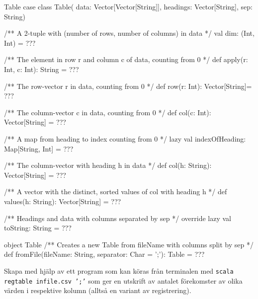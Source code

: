 \clearpage
\begin{ScalaSpec}{Table}
case class Table(
  data: Vector[Vector[String]],
  headings: Vector[String],
  sep: String){
  /** A 2-tuple with (number of rows, number of columns) in data */
  val dim: (Int, Int) = ???

  /** The element in row r and column c of data, counting from 0 */
  def apply(r: Int, c: Int): String = ???

  /** The row-vector r in data, counting from 0 */
  def row(r: Int): Vector[String]= ???

  /** The column-vector c in data, counting from 0 */
  def col(c: Int): Vector[String] = ???

  /** A map from heading to index counting from 0 */
  lazy val indexOfHeading: Map[String, Int] = ???

  /** The column-vector with heading h in data */
  def col(h: String): Vector[String] = ???

  /** A vector with the distinct, sorted values of col with heading h */
  def values(h: String): Vector[String] = ???

  /** Headings and data with columns separated by sep */
  override lazy val toString: String = ???
}
object Table {
  /** Creates a new Table from fileName with columns split by sep */
  def fromFile(fileName: String, separator: Char = ';'): Table = ???
}
\end{ScalaSpec}




\Subtask Skapa med hjälp av  ett program som kan köras från terminalen med \texttt{scala regtable infile.csv ';'} som ger en utskrift av antalet förekomster av olika värden i respektive kolumn (alltså en variant av registrering).


\SOLUTION


\TaskSolved \what

